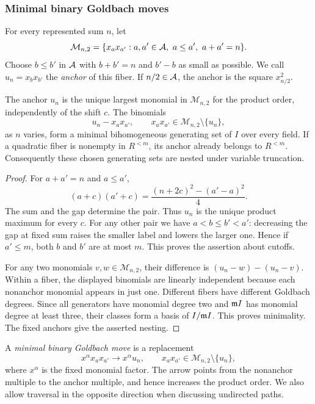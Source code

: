 \subsubsection{Minimal binary Goldbach moves}
For every represented sum $n$, let
\[
 \mathcal M_{n,2}=\{x_ax_{a'}:a,a'\in\mathcal A,\ a\le a',\ a+a'=n\}.
\]
Choose $b\le b'$ in $\mathcal A$ with $b+b'=n$ and $b'-b$ as small as
possible. We call $u_n=x_bx_{b'}$ the \emph{anchor} of this fiber.
If $n/2\in\mathcal A$, the anchor is the square $x_{n/2}^2$.

\begin{proposition}\label{moves:anchors}
The anchor $u_n$ is the unique largest monomial in $\mathcal M_{n,2}$
for the product order, independently of the shift $c$. The binomials
\[
 u_n-x_ax_{a'},\qquad
 x_ax_{a'}\in\mathcal M_{n,2}\setminus\{u_n\},
\]
as $n$ varies, form a minimal bihomogeneous generating set of $I$
over every field. If a quadratic fiber is nonempty in $R^{<m}$, its
anchor already belongs to $R^{<m}$. Consequently these chosen
generating sets are nested under variable truncation.
\end{proposition}
\begin{proof}
For $a+a'=n$ and $a\le a'$,
\[
 (a+c)(a'+c)=\frac{(n+2c)^2-(a'-a)^2}{4}.
\]
The sum and the gap determine the pair. Thus $u_n$ is the unique
product maximum for every $c$. For any other pair we have
$a<b\le b'<a'$: decreasing the gap at fixed sum raises the smaller
label and lowers the larger one. Hence if $a'\le m$, both $b$ and $b'$
are at most $m$. This proves the assertion about cutoffs.

For any two monomials $v,w\in\mathcal M_{n,2}$, their difference
is $(u_n-w)-(u_n-v)$. Within a fiber, the displayed binomials are
linearly independent because each nonanchor monomial appears in just one.
Different fibers have different Goldbach degrees. Since all generators
have monomial degree two and $\mathfrak m I$ has monomial degree at least
three, their classes form a basis of $I/\mathfrak m I$. This proves
minimality. The fixed anchors give the asserted nesting.
\end{proof}

\begin{definition}\label{moves:minimal}
A \emph{minimal binary Goldbach move} is a replacement
\[
 x^\alpha x_ax_{a'}\longrightarrow x^\alpha u_n,\qquad
 x_ax_{a'}\in\mathcal M_{n,2}\setminus\{u_n\},
\]
where $x^\alpha$ is the fixed monomial factor. The arrow points
from the nonanchor multiple to the anchor multiple, and hence
increases the product order. We also allow traversal in the opposite
direction when discussing undirected paths.
\end{definition}

